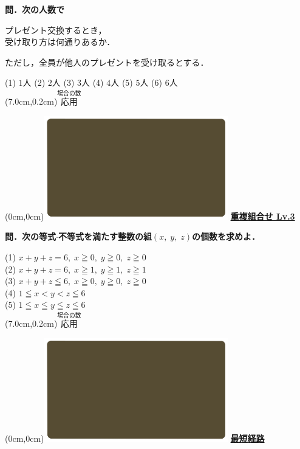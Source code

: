 \documentclass[10pt,
fleqn,
dvipdfmx,
uplatex
]{jsarticle}
\begin{document}
\small
\bf\boldmath 問．次の人数で

\LARGE
\vspace{-0.2zw}
プレゼント交換するとき，\\
\hfill 受け取り方は何通りあるか．
\vspace{0.2zw}

\small
ただし，全員が他人のプレゼントを受け取るとする．

\small
(1)  $1$人\hfill
(2)  $2$人\hfill
(3)  $3$人\hfill
(4)  $4$人\hfill
(5)  $5$人\hfill
(6)  $6$人\hfill\\

\at(7.0cm,0.2cm){\small\color{bradorange}$\overset{\text{場合の数}}{\text{応用}}$}


\newpage



\at(0cm,0cm){\includegraphics[width=8cm,bb=0 0 1920 1080]{./youtube/thumbnails/templates/smart_background/場合の数.jpeg}}
{\color{orange}\bf\boldmath\huge\underline{重複組合せ Lv.3 }}\vspace{0.3zw}

\scriptsize
\bf\boldmath 問．次の等式$\cdot$不等式を満たす整数の組$\left(x,\;y,\;z\right)$の個数を求めよ．

\normalsize
\vspace{-0.2zw}
(1)  $x+y+z=6,\;x\geqq 0,\;y\geqq 0,\;z\geqq 0$\\
(2)  $x+y+z=6,\;x\geqq 1,\;y\geqq 1,\;z\geqq 1$\\
(3)  $x+y+z\leqq 6,\;x\geqq 0,\;y\geqq 0,\;z\geqq 0$\\
(4)  $1\leqq x<y<z\leqq 6$\\
(5)  $1\leqq x\leqq y\leqq z\leqq 6$\\

\at(7.0cm,0.2cm){\small\color{bradorange}$\overset{\text{場合の数}}{\text{応用}}$}


\newpage



\at(0cm,0cm){\includegraphics[width=8cm,bb=0 0 1920 1080]{./youtube/thumbnails/templates/smart_background/場合の数.jpeg}}
{\color{orange}\bf\boldmath\huge\underline{最短経路}}\vspace{0.3zw}
\end{document}
